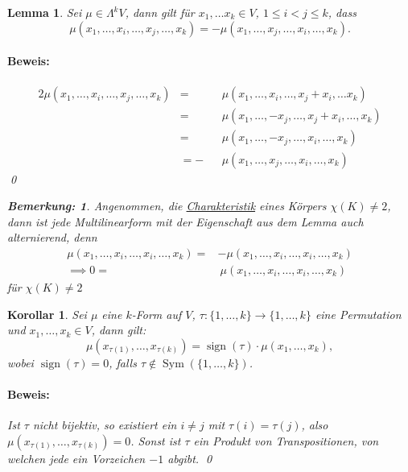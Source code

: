 \documentclass{report}
\DeclareMathOperator{\Sym}{Sym}
\DeclareMathOperator{\sign}{sign}
\theoremstyle{customrem}
\newtheorem*{bemerkung}{Bemerkung\textnormal:}
\theoremstyle{customdef}
\newtheorem{lemma}[definition]{Lemma}
\newtheorem{korrolar}[definition]{Korollar}
\renewenvironment{proof}{\paragraph{Beweis: }}{\qed}
\theoremstyle{customenv}
\begin{document}
	\begin{lemma}
		Sei \(\mu\in\Lambda^kV\), dann gilt für \(x_1,\ldots x_k\in V\), \(1\leq i<j\leq k\), dass \[\mu(x_1,\ldots, x_i,\ldots, x_j,\ldots, x_k) = -\mu(x_1,\ldots, x_j,\ldots, x_i,\ldots, x_k).\]
		\begin{proof}
			\begin{alignat*}{2}
				\mu(x_1,\ldots, x_i, \ldots, x_j, \ldots, x_k) 	&=  &&\mu(x_1, \ldots,  x_i, \ldots, x_j+x_i, \ldots x_k)\\
																&=  &&\mu(x_1, \ldots, -x_j, \ldots, x_j+x_i, \ldots, x_k)\\
																&=  &&\mu(x_1, \ldots, -x_j, \ldots, x_i, \ldots, x_k)\\
																&= -&&\mu(x_1, \ldots,  x_j, \ldots, x_i, \ldots, x_k)
			\end{alignat*}
		\end{proof}
		\begin{bemerkung}
			Angenommen, die \hyperref[lem142]{Charakteristik} eines Körpers \(\chi(K)\neq 2\), dann ist jede Multilinearform mit der Eigenschaft aus dem Lemma auch alternierend, denn
			\begin{align*}
				\mu(x_1, \ldots, x_i, \ldots, x_i, \ldots, x_k) =	& -\mu(x_1, \ldots, x_i, \ldots, x_i, \ldots, x_k)\\
														\implies 0=	&\  \mu(x_1, \ldots, x_i, \ldots, x_i, \ldots, x_k)
			\end{align*}
			für \(\chi(K)\neq 2\)
		\end{bemerkung}
	\end{lemma}

	\begin{korrolar}
		Sei \(\mu\) eine \(k\)-Form auf \(V\), \(\tau:\{1,\ldots, k\}\to\{1,\ldots, k\}\) eine Permutation und \(x_1,\ldots, x_k\in V\), dann gilt: \[\mu(x_{\tau(1)},\ldots, x_{\tau(k)}) = \sign(\tau)\cdot \mu(x_1,\ldots, x_k), \] wobei \(\sign(\tau)=0\), falls \(\tau\notin\Sym(\{1,\ldots, k\})\).
		\begin{proof}
			Ist \(\tau\) nicht bijektiv, so existiert ein \(i\neq j\) mit \(\tau(i)=\tau(j)\), also \(\mu(x_{\tau(1)},\ldots, x_{\tau(k)}) = 0\). Sonst ist \(\tau\) ein Produkt von Transpositionen, von welchen jede ein Vorzeichen \(-1\) abgibt.
		\end{proof}
	\end{korrolar}
\end{document}

